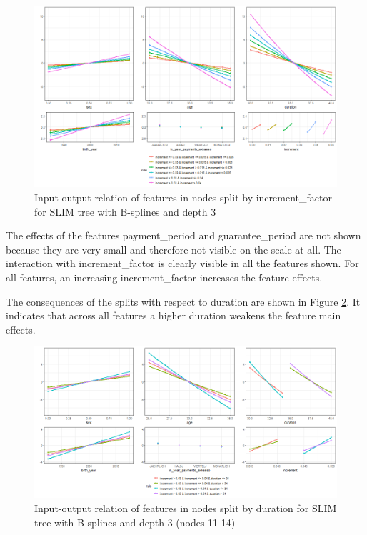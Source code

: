 \begin{figure}[!htb]
    \centering    
    \includegraphics[width=16cm]{Figures/insurance_use_case/k1_08_BPV/effects_increment_factor.png}
    \caption{Input-output relation of features in nodes split by increment\_factor for SLIM tree with B-splines and depth 3}
    \label{fig:ins_k108_effects_increment}
\end{figure}

The effects of the features payment\_period and guarantee\_period are not shown because they are very small and therefore not visible on the scale at all.
The interaction with increment\_factor is clearly visible in all the features shown. For all features, an increasing increment\_factor increases the feature effects.


The consequences of the splits with respect to duration are shown in Figure \ref{fig:ins_k108_effects_duration}. It indicates that across all features a higher duration weakens the feature main effects.

\begin{figure}[!htb]
    \centering 
    \includegraphics[width=16cm]{Figures/insurance_use_case/k1_08_BPV/effects_duration.png}
    \caption{Input-output relation of features in nodes split by duration for SLIM tree with B-splines and depth 3 (nodes 11-14)}
    \label{fig:ins_k108_effects_duration}
\end{figure}


